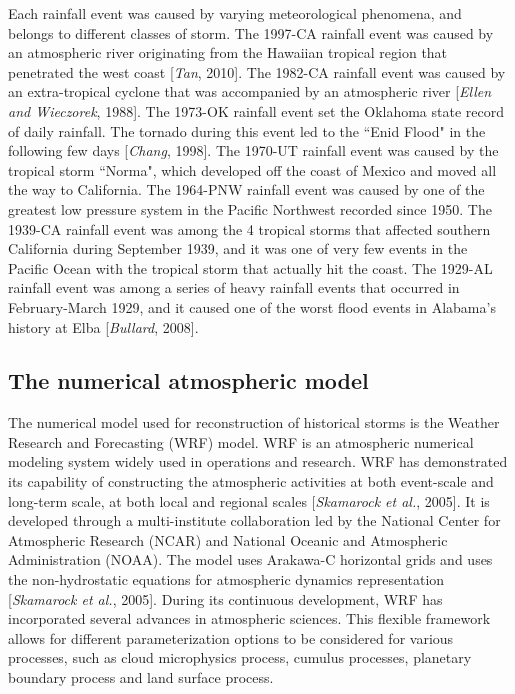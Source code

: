 Each rainfall event was caused by varying meteorological phenomena, and belongs to different classes of storm. The 1997-CA rainfall event was caused by an atmospheric river originating from the Hawaiian tropical region that penetrated the west coast [\textit{Tan}, 2010]. The 1982-CA rainfall event was caused by an extra-tropical cyclone that was accompanied by an atmospheric river [\textit{Ellen and Wieczorek}, 1988]. The 1973-OK rainfall event set the Oklahoma state record of daily rainfall. The tornado during this event led to the ``Enid Flood" in the following few days [\textit{Chang}, 1998]. The 1970-UT rainfall event was caused by the tropical storm ``Norma", which developed off the coast of Mexico and moved all the way to California. The 1964-PNW rainfall event was caused by one of the greatest low pressure system in the Pacific Northwest recorded since 1950. The 1939-CA rainfall event was among the 4 tropical storms that affected southern California during September 1939, and it was one of very few events in the Pacific Ocean with the tropical storm that actually hit the coast. The 1929-AL rainfall event was among a series of heavy rainfall events that occurred in February-March 1929, and it caused one of the worst flood events in Alabama’s history at Elba [\textit{Bullard}, 2008].

\subsection{The numerical atmospheric model}

The numerical model used for reconstruction of historical storms is the Weather Research and Forecasting (WRF) model. WRF is an atmospheric numerical modeling system widely used in operations and research. WRF has demonstrated its capability of constructing the atmospheric activities at both event-scale and long-term scale, at both local and regional scales [\textit{Skamarock et al.}, 2005]. It is developed through a multi-institute collaboration led by the National Center for Atmospheric Research (NCAR) and National Oceanic and Atmospheric Administration (NOAA). The model uses Arakawa-C horizontal grids and uses the non-hydrostatic equations for atmospheric dynamics representation [\textit{Skamarock et al.}, 2005].
During its continuous development, WRF has incorporated several advances in atmospheric sciences. This flexible framework allows for different parameterization options to be considered for various processes, such as cloud microphysics process, cumulus processes, planetary boundary process and land surface process.

